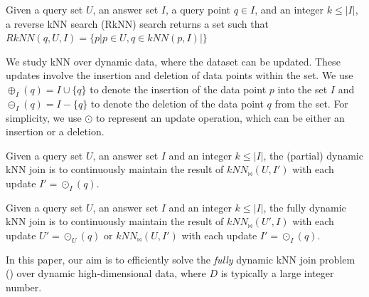 \begin{definition}\label{def:rknnj}
  Given a query set $U$, an answer set $I$, a query point $q\in I$, and an integer $k\leq|I|$, a reverse kNN search (RkNN) search returns a set such that $RkNN(q,U,I)=\{p|p\in U, q\in kNN(p, I)|\}$
\end{definition}

We study kNN over dynamic data, where the dataset can be updated. These updates involve the insertion and deletion of data points within the set. 
%
We use $\oplus_{I}(q) = I \cup \{q\}$ to denote the insertion of the data point $p$ into the set $I$ and $\ominus_{I}(q) = I - \{q\}$ to denote the deletion of the data point $q$ from the set. For simplicity, we use $\odot$ to represent an update operation, which can be either an insertion or a deletion.

\begin{definition}\label{def:dynamic-knnj}
  Given a query set $U$, an answer set $I$ and an integer $k\leq|I|$, the (partial) dynamic kNN join is to continuously maintain the result of $kNN_{\bowtie}(U,I')$ with each update $I'=\odot_I(q)$.
\end{definition}

\begin{definition}\label{def:fully-dynamic-knnj}
 Given a query set $U$, an answer set $I$ and an integer $k\leq|I|$, the fully dynamic kNN join is to continuously maintain the result of $kNN_{\bowtie}(U',I)$ with each update $U'=\odot_U(q)$ or $kNN_{\bowtie}(U,I')$ with each update $I'=\odot_I(q)$.
\end{definition}

%
In this paper, our aim is to efficiently solve the \emph{fully} dynamic kNN join problem (\fdknnj) over dynamic high-dimensional data, where $D$ is typically a large integer number.


